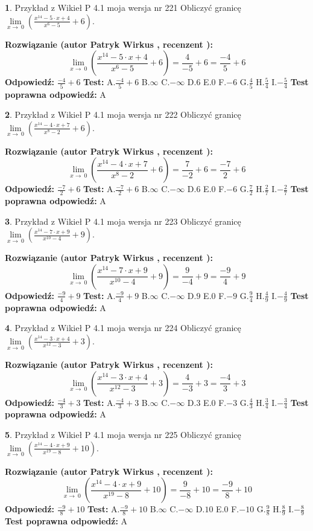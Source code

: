 \documentclass[12pt, a4paper]{article}
\theoremstyle{definition} %
\newtheorem{zad}{}
\newcommand{\zadStart}[1]{\begin{zad}#1\newline}
\newcommand{\zadStop}{\end{zad}}
\newcommand{\rozwStart}[2]{\noindent \textbf{Rozwiązanie (autor #1 , recenzent #2): }\newline}
\newcommand{\rozwStop}{\newline}
\newcommand{\odpStart}{\noindent \textbf{Odpowiedź:}\newline}
\newcommand{\odpStop}{\newline}
\newcommand{\testStart}{\noindent \textbf{Test:}\newline}
\newcommand{\testStop}{\newline}
\newcommand{\kluczStart}{\noindent \textbf{Test poprawna odpowiedź:}\newline}
\newcommand{\kluczStop}{\newline}
\begin{document}
\zadStart{Przykład z Wikieł P 4.1 moja wersja nr 221}
Obliczyć granicę $\lim\limits_{x\to\ 0}(\frac{x^{14}-5 \cdot x +4}{x^{6}-5}+6)$.
\zadStop
\rozwStart{Patryk Wirkus}{}
$$\lim\limits_{x\to\ 0}(\frac{x^{14}-5 \cdot x +4}{x^{6}-5}+6)=\frac{4}{-5}+6=\frac{-4}{5}+6$$
\rozwStop
\odpStart
$\frac{-4}{5}+6$
\odpStop
\testStart
A.$\frac{-4}{5}+6$
B.$\infty$
C.$-\infty$
D.$6$
E.$0$
F.$-6$
G.$\frac{4}{5}$
H.$\frac{5}{4}$
I.$-\frac{5}{4}$
\testStop
\kluczStart
A
\kluczStop



\zadStart{Przykład z Wikieł P 4.1 moja wersja nr 222}
Obliczyć granicę $\lim\limits_{x\to\ 0}(\frac{x^{14}-4 \cdot x +7}{x^{8}-2}+6)$.
\zadStop
\rozwStart{Patryk Wirkus}{}
$$\lim\limits_{x\to\ 0}(\frac{x^{14}-4 \cdot x +7}{x^{8}-2}+6)=\frac{7}{-2}+6=\frac{-7}{2}+6$$
\rozwStop
\odpStart
$\frac{-7}{2}+6$
\odpStop
\testStart
A.$\frac{-7}{2}+6$
B.$\infty$
C.$-\infty$
D.$6$
E.$0$
F.$-6$
G.$\frac{7}{2}$
H.$\frac{2}{7}$
I.$-\frac{2}{7}$
\testStop
\kluczStart
A
\kluczStop



\zadStart{Przykład z Wikieł P 4.1 moja wersja nr 223}
Obliczyć granicę $\lim\limits_{x\to\ 0}(\frac{x^{14}-7 \cdot x +9}{x^{10}-4}+9)$.
\zadStop
\rozwStart{Patryk Wirkus}{}
$$\lim\limits_{x\to\ 0}(\frac{x^{14}-7 \cdot x +9}{x^{10}-4}+9)=\frac{9}{-4}+9=\frac{-9}{4}+9$$
\rozwStop
\odpStart
$\frac{-9}{4}+9$
\odpStop
\testStart
A.$\frac{-9}{4}+9$
B.$\infty$
C.$-\infty$
D.$9$
E.$0$
F.$-9$
G.$\frac{9}{4}$
H.$\frac{4}{9}$
I.$-\frac{4}{9}$
\testStop
\kluczStart
A
\kluczStop



\zadStart{Przykład z Wikieł P 4.1 moja wersja nr 224}
Obliczyć granicę $\lim\limits_{x\to\ 0}(\frac{x^{14}-3 \cdot x +4}{x^{12}-3}+3)$.
\zadStop
\rozwStart{Patryk Wirkus}{}
$$\lim\limits_{x\to\ 0}(\frac{x^{14}-3 \cdot x +4}{x^{12}-3}+3)=\frac{4}{-3}+3=\frac{-4}{3}+3$$
\rozwStop
\odpStart
$\frac{-4}{3}+3$
\odpStop
\testStart
A.$\frac{-4}{3}+3$
B.$\infty$
C.$-\infty$
D.$3$
E.$0$
F.$-3$
G.$\frac{4}{3}$
H.$\frac{3}{4}$
I.$-\frac{3}{4}$
\testStop
\kluczStart
A
\kluczStop



\zadStart{Przykład z Wikieł P 4.1 moja wersja nr 225}
Obliczyć granicę $\lim\limits_{x\to\ 0}(\frac{x^{14}-4 \cdot x +9}{x^{19}-8}+10)$.
\zadStop
\rozwStart{Patryk Wirkus}{}
$$\lim\limits_{x\to\ 0}(\frac{x^{14}-4 \cdot x +9}{x^{19}-8}+10)=\frac{9}{-8}+10=\frac{-9}{8}+10$$
\rozwStop
\odpStart
$\frac{-9}{8}+10$
\odpStop
\testStart
A.$\frac{-9}{8}+10$
B.$\infty$
C.$-\infty$
D.$10$
E.$0$
F.$-10$
G.$\frac{9}{8}$
H.$\frac{8}{9}$
I.$-\frac{8}{9}$
\testStop
\kluczStart
A
\kluczStop
\end{document}
